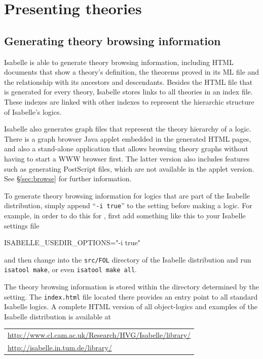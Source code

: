 

\chapter{Presenting theories}

\section{Generating theory browsing information} \label{sec:info}

Isabelle is able to generate theory browsing information, including HTML
documents that show a theory's definition, the theorems proved in its ML file
and the relationship with its ancestors and descendants.  Besides the HTML
file that is generated for every theory, Isabelle stores links to all theories
in an index file. These indexes are linked with other indexes to represent the
hierarchic structure of Isabelle's logics.

Isabelle also generates graph files that represent the theory hierarchy of a
logic.  There is a graph browser Java applet embedded in the generated HTML
pages, and also a stand-alone application that allows browsing theory graphs
without having to start a WWW browser first.  The latter version also includes
features such as generating {\sc PostScript} files, which are not available in
the applet version.  See \S\ref{sec:browse} for further information.

\medskip

To generate theory browsing information for logics that are part of the
Isabelle distribution, simply append ``\texttt{-i true}'' to the
 setting before making a logic.  For example,
in order to do this for {\FOL}, first add something like this to your Isabelle
settings file
\begin{ttbox}
ISABELLE_USEDIR_OPTIONS="-i true"
\end{ttbox}
and then change into the \texttt{src/FOL} directory of the Isabelle
distribution and run \texttt{isatool make}, or even \texttt{isatool make all}.

\medskip

The theory browsing information is stored within the directory determined by
the  setting.  The \texttt{index.html} file
located there provides an entry point to all standard Isabelle logics.  A
complete HTML version of all object-logics and examples of the Isabelle
distribution is available at
\begin{center}\small
  \begin{tabular}{l}
    \url{http://www.cl.cam.ac.uk/Research/HVG/Isabelle/library/} \\
    \url{http://isabelle.in.tum.de/library/} \\
  \end{tabular}
\end{center}

